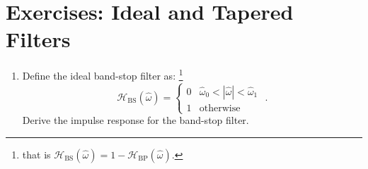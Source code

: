 \newpage
\section{Exercises: Ideal and Tapered Filters}

\begin{enumerate}
\item Define the ideal band-stop filter as: \footnote{that is $\mathcal{H}_{\mathrm{BS}}(\hat{\omega})=1 - \mathcal{H}_{\mathrm{BP}}(\hat{\omega})$.}
\begin{equation}
\mathcal{H}_{\mathrm{BS}}(\hat{\omega}) = \left\{ \begin{array}{cc}
0 & \hat{\omega}_0 < |\hat{\omega}| < \hat{\omega}_1 \\
1 & \mathrm{otherwise}
\end{array}\right.\,\,.
\end{equation}
Derive the impulse response for the band-stop filter.













\end{enumerate}